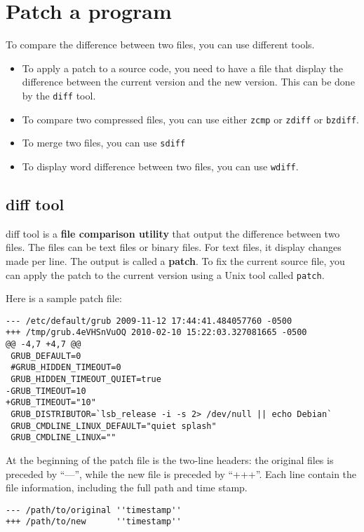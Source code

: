 
\chapter{Patch a program}
\label{chap:patch-program}

To compare the difference between two files, you can use different
tools.
\begin{itemize}
\item To apply a patch to a source code, you need to have a file that
display the difference between the current version and the new
version.  This can be done by the \verb!diff! tool.

\item To compare two compressed files, you can use either \verb!zcmp!
  or \verb!zdiff! or \verb!bzdiff!. 

\item To merge two files,  you can use \verb!sdiff!

\item To display word difference between two files, you can use
  \verb!wdiff!. 
\end{itemize}

\section{diff tool}
\label{sec:diff-tool}

diff tool is a {\bf file comparison utility} that output the
difference between two files. The files can be text files or binary
files. For text files, it display changes made per line. The output is
called a {\bf patch}. To fix the current source file, you can apply
the patch to the current version using a Unix tool called
\verb!patch!.

Here is a sample patch file:
\begin{verbatim}
--- /etc/default/grub 2009-11-12 17:44:41.484057760 -0500
+++ /tmp/grub.4eVHSnVuOQ 2010-02-10 15:22:03.327081665 -0500
@@ -4,7 +4,7 @@
 GRUB_DEFAULT=0
 #GRUB_HIDDEN_TIMEOUT=0
 GRUB_HIDDEN_TIMEOUT_QUIET=true
-GRUB_TIMEOUT=10
+GRUB_TIMEOUT="10"
 GRUB_DISTRIBUTOR=`lsb_release -i -s 2> /dev/null || echo Debian`
 GRUB_CMDLINE_LINUX_DEFAULT="quiet splash"
 GRUB_CMDLINE_LINUX=""
\end{verbatim}
At the beginning of the patch file is the two-line headers: the
original files is preceded by ``---'', while the new file is preceded
by ``+++''. Each line contain the file information, including the full
path and time stamp. 
\begin{verbatim}
--- /path/to/original ''timestamp''
+++ /path/to/new      ''timestamp''
\end{verbatim}

